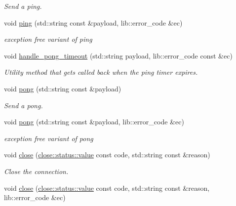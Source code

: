 \begin{DoxyCompactItemize}
\begin{DoxyCompactList}\small\item\em Send a ping. \end{DoxyCompactList}\item 
void \hyperlink{classwebsocketpp_1_1connection_a6766e2f31adc6843a983551b21683b73}{ping} (std\+::string const \&payload, lib\+::error\+\_\+code \&ec)
\begin{DoxyCompactList}\small\item\em exception free variant of ping \end{DoxyCompactList}\item 
void \hyperlink{classwebsocketpp_1_1connection_af10cbbbfe16ef1cc6f45614582c9d28f}{handle\+\_\+pong\+\_\+timeout} (std\+::string payload, lib\+::error\+\_\+code const \&ec)
\begin{DoxyCompactList}\small\item\em Utility method that gets called back when the ping timer expires. \end{DoxyCompactList}\item 
void \hyperlink{classwebsocketpp_1_1connection_aa8684fcfd9a57466ae1b52e36b834408}{pong} (std\+::string const \&payload)
\begin{DoxyCompactList}\small\item\em Send a pong. \end{DoxyCompactList}\item 
void \hyperlink{classwebsocketpp_1_1connection_a837dcb8f1214f08b92e7ae7489bfa180}{pong} (std\+::string const \&payload, lib\+::error\+\_\+code \&ec)
\begin{DoxyCompactList}\small\item\em exception free variant of pong \end{DoxyCompactList}\item 
void \hyperlink{classwebsocketpp_1_1connection_ae718e4fa8b2c37757d8abd71dae07dc9}{close} (\hyperlink{namespacewebsocketpp_1_1close_1_1status_a8614a5c4733d708e2d2a32191c5bef84}{close\+::status\+::value} const code, std\+::string const \&reason)
\begin{DoxyCompactList}\small\item\em Close the connection. \end{DoxyCompactList}\item 
void \hyperlink{classwebsocketpp_1_1connection_a436058fe88b1ba31080cec2a464634ae}{close} (\hyperlink{namespacewebsocketpp_1_1close_1_1status_a8614a5c4733d708e2d2a32191c5bef84}{close\+::status\+::value} const code, std\+::string const \&reason, lib\+::error\+\_\+code \&ec)

\end{DoxyCompactItemize}
